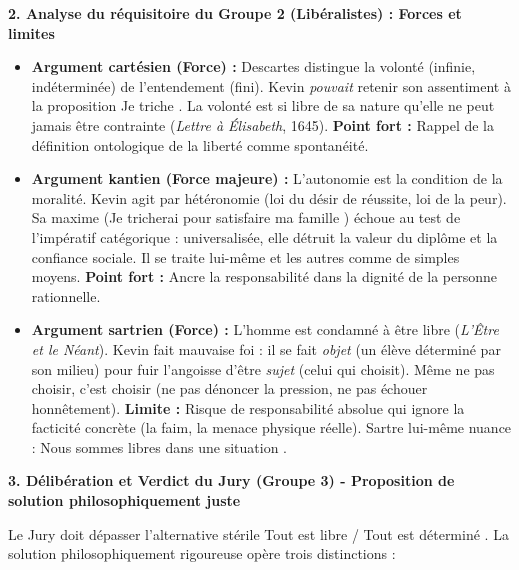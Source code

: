 \documentclass[11pt]{article}
\newcommand{\cle}[1]{{\popxbold\color{popdark}#1}}
\begin{document}
\begin{exoresolu}
\textbf{2. Analyse du réquisitoire du Groupe 2 (Libéralistes) : Forces et limites}

\begin{itemize}
    \item \textbf{Argument cartésien (Force) :} Descartes distingue la \cle{volonté} (infinie, indéterminée) de l'\cle{entendement} (fini). Kevin \emph{pouvait} retenir son assentiment à la proposition \guillemotleft Je triche \guillemotright. \guillemotleft La volonté est si libre de sa nature qu'elle ne peut jamais être contrainte \guillemotright (\emph{Lettre à Élisabeth}, 1645). \textbf{Point fort :} Rappel de la définition ontologique de la liberté comme \cle{spontanéité}.
    \item \textbf{Argument kantien (Force majeure) :} L'\cle{autonomie} est la condition de la moralité. Kevin agit par \cle{hétéronomie} (loi du désir de réussite, loi de la peur). Sa maxime (\guillemotleft Je tricherai pour satisfaire ma famille \guillemotright) échoue au test de l'\cle{impératif catégorique} : universalisée, elle détruit la valeur du diplôme et la confiance sociale. Il se traite lui-même et les autres comme de simples \cle{moyens}. \textbf{Point fort :} Ancre la responsabilité dans la \cle{dignité} de la personne rationnelle.
    \item \textbf{Argument sartrien (Force) :} \guillemotleft L'homme est condamné à être libre \guillemotright (\emph{L'Être et le Néant}). Kevin fait \cle{mauvaise foi} : il se fait \emph{objet} (un élève déterminé par son milieu) pour fuir l'\cle{angoisse} d'être \emph{sujet} (celui qui choisit). Même ne pas choisir, c'est choisir (ne pas dénoncer la pression, ne pas échouer honnêtement). \textbf{Limite :} Risque de \guillemotleft responsabilité absolue \guillemotright qui ignore la \cle{facticité} concrète (la faim, la menace physique réelle). Sartre lui-même nuance : \guillemotleft Nous sommes libres dans une situation \guillemotright.
\end{itemize}

\textbf{3. Délibération et Verdict du Jury (Groupe 3) - Proposition de solution philosophiquement juste}

Le Jury doit dépasser l'alternative stérile \guillemotleft Tout est libre \guillemotright / \guillemotleft Tout est déterminé \guillemotright. La solution philosophiquement rigoureuse opère trois distinctions :


\end{exoresolu}
\end{document}
